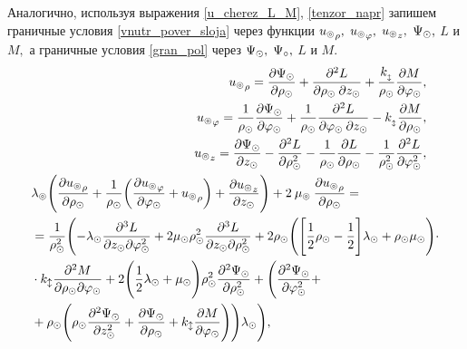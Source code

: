 Аналогично, используя выражения \eqref{u_cherez_L_M}, \eqref{tenzor_napr} запишем граничные условия \eqref{vnutr_pover_sloja} через функции ${u_\circledcirc}_\rho,$ ${u_\circledcirc}_\varphi,$ ${u_\circledcirc}_z,$ $ \Psi_\odot,$ $L$ и $M ,$ а граничные условия \eqref{gran_pol} через $\Psi_\odot,$ $ \Psi_\circ,$ $L$ и $M.$
\begin{align}
\begin{split}
&{u_\circledcirc}_\rho=\frac{\partial \Psi_\odot}{\partial\rho_\odot}+\frac{\partial^2 L}{\partial\rho_\odot\:\partial z_\odot}+\frac{k_{_\updownarrow}}{\rho_\odot}\frac{\partial M}{\partial \varphi_\odot},
\end{split}\\
\begin{split}
&{u_\circledcirc}_\varphi=\frac{1}{\rho_\odot}\frac{\partial \Psi_\odot}{\partial \varphi_\odot}+\frac{1}{\rho_\odot}\frac{\partial^{2} L}{\partial\varphi_\odot\: \partial z_\odot}-k_{_\updownarrow}\frac{\partial M}{\partial \rho_\odot},
\end{split}\\
\begin{split}
&{u_\circledcirc}_z=\frac{\partial\Psi_\odot}{\partial z_\odot}-\frac{\partial^{2} L}{\partial \rho^2_\odot}-\frac{1}{\rho_\odot}\frac{\partial L}{\partial \rho_\odot}-\frac{1}{\rho^2_\odot}\frac{\partial^2L}{\partial\varphi^2_\odot},
\end{split}\\
\begin{split}
&\lambda_\circledcirc\Biggl(\frac{\partial {u_\circledcirc}_{\rho}}{\partial \rho_\odot}+\frac{1}{\rho_\odot}\biggl(\frac{\partial {u_\circledcirc}_\varphi}{\partial\varphi_\odot}+{u_\circledcirc}_{\rho}\biggr)+\frac{\partial {u_\circledcirc}_z}{\partial z_\odot}\Biggr)+2\:\mu_\circledcirc\:\frac{\partial {u_\circledcirc}_{\rho}}{\partial \rho_\odot}=\\
&=\frac1{\rho^2_\odot}\Biggl(
-\lambda_\odot\frac{\partial^3L}{\partial z_\odot\partial\varphi^2_\odot}
+2\mu_\odot \rho^2_\odot\frac{\partial^3L}{\partial z_\odot\partial\rho^2_\odot}
+2\rho_\odot\Biggl(\Biggl[\frac12\rho_\odot
-\frac12\Biggr]\lambda_\odot
+\rho_\odot\mu_\odot\Biggr)\cdot\\
&\cdot k_\updownarrow\frac{\partial^2M}{\partial \rho_\odot\partial\varphi_\odot}
+2\Biggl(\frac12\lambda_\odot
+\mu_\odot\Biggr)\rho^2_\odot\frac{\partial^2\Psi_\odot}{\partial \rho^2_\odot}
+\Biggl(\frac{\partial^2\Psi_\odot}{\partial\varphi^2_\odot}+\\
&+\rho_\odot\Biggl(\rho_\odot\frac{\partial^2\Psi_\odot}{\partial z^2_\odot}
+\frac{\partial \Psi_\odot}{\partial \rho_\odot}
+k_\updownarrow\frac{\partial M}{\partial\varphi_\odot}\Biggr)\Biggr)\lambda_\odot\Biggr),
\end{split}
\end{align}
